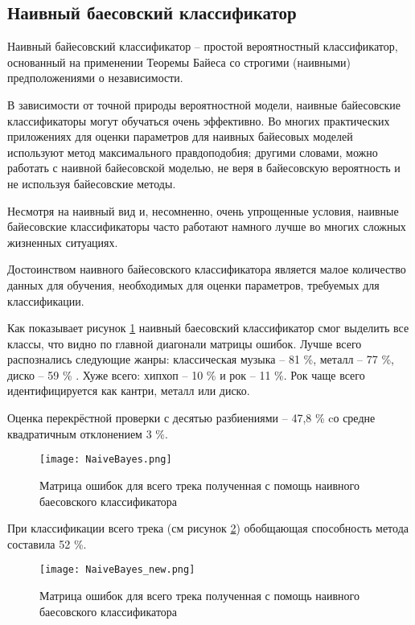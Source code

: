 \subsection{Наивный баесовский классификатор}

Наивный байесовский классификатор -- простой вероятностный классификатор, основанный на применении Теоремы Байеса со строгими (наивными) предположениями о независимости.

В зависимости от точной природы вероятностной модели, наивные байесовские классификаторы могут обучаться очень эффективно. Во многих практических приложениях для оценки параметров для наивных байесовых моделей используют метод максимального правдоподобия; другими словами, можно работать с наивной байесовской моделью, не веря в байесовскую вероятность и не используя байесовские методы.

Несмотря на наивный вид и, несомненно, очень упрощенные условия, наивные байесовские классификаторы часто работают намного лучше во многих сложных жизненных ситуациях.

Достоинством наивного байесовского классификатора является малое количество данных для обучения, необходимых для оценки параметров, требуемых для классификации.

Как показывает рисунок \ref{fig:results:NaiveBayes} наивный баесовский классификатор смог выделить все классы, что видно по главной диагонали матрицы ошибок. Лучше всего распознались следующие жанры: классическая музыка -- 81 \%, металл -- 77 \%, диско -- 59 \% . Хуже всего: хипхоп -- 10 \% и рок -- 11 \%.  Рок чаще всего идентифицируется как кантри, металл или диско.

Оценка перекрёстной проверки с десятью разбиениями -- 47,8 \% cо средне квадратичным отклонением 3 \%.  

\begin{figure}[h]
\centering
  \texttt{[image: NaiveBayes.png]}
  \caption{Матрица ошибок  для всего трека полученная с помощь наивного баесовского классификатора}
  \label{fig:results:NaiveBayes}
\end{figure}

При классификации всего трека (см рисунок \ref{fig:results:NaiveBayes_new}) обобщающая способность метода составила 52 \%. 

\begin{figure}[h]
\centering
  \texttt{[image: NaiveBayes\_new.png]}
  \caption{Матрица ошибок  для всего трека полученная с помощь наивного баесовского классификатора}
  \label{fig:results:NaiveBayes_new}
\end{figure}

